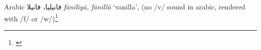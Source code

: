 \begin{etymology}\label{ety:faniliya}
Arabic {فانيليا، فانيلا} \textit{fānīliyā, fānīllā} `vanilla', (no /v/ sound in arabic, rendered with /f/ or /w/)\footnote{\textcite[814]{baalbaki_-mawrid_1995}}
\end{etymology}